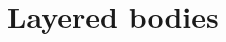\documentclass[a4paper,compress]{beamer}
\begin{document}
% 
% 



\section{Layered bodies}
\end{document}
